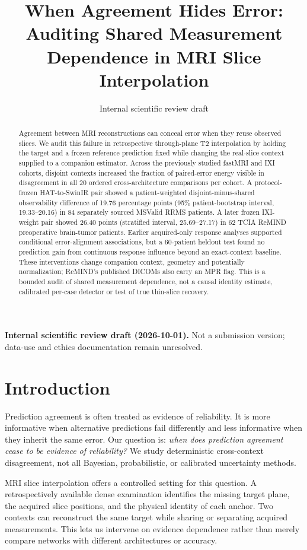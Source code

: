 \documentclass[10pt,twocolumn,letterpaper]{article}
\title{When Agreement Hides Error:\\
Auditing Shared Measurement Dependence in MRI Slice Interpolation}
\author{Internal scientific review draft}
\begin{document}
\maketitle
\noindent\textbf{Internal scientific review draft (2026-10-01).} Not a submission version; data-use and ethics documentation remain unresolved.\par\smallskip

\begin{abstract}
Agreement between MRI reconstructions can conceal error when they reuse observed slices. We audit this failure in retrospective through-plane T2 interpolation by holding the target and a frozen reference prediction fixed while changing the real-slice context supplied to a companion estimator. Across the previously studied fastMRI and IXI cohorts, disjoint contexts increased the fraction of paired-error energy visible in disagreement in all 20 ordered cross-architecture comparisons per cohort. A protocol-frozen HAT-to-SwinIR pair showed a patient-weighted disjoint-minus-shared observability difference of 19.76 percentage points (95\% patient-bootstrap interval, 19.33--20.16) in 84 separately sourced MSValid RRMS patients. A later frozen IXI-weight pair showed 26.40 points (stratified interval, 25.69--27.17) in 62 TCIA ReMIND preoperative brain-tumor patients. Earlier acquired-only response analyses supported conditional error-alignment associations, but a 60-patient heldout test found no prediction gain from continuous response influence beyond an exact-context baseline. These interventions change companion context, geometry and potentially normalization; ReMIND's published DICOMs also carry an MPR flag. This is a bounded audit of shared measurement dependence, not a causal identity estimate, calibrated per-case detector or test of true thin-slice recovery.
\end{abstract}

\section{Introduction}
Prediction agreement is often treated as evidence of reliability. It is more informative when alternative predictions fail differently and less informative when they inherit the same error. Our question is: \emph{when does prediction agreement cease to be evidence of reliability?} We study deterministic cross-context disagreement, not all Bayesian, probabilistic, or calibrated uncertainty methods.

MRI slice interpolation offers a controlled setting for this question. A retrospectively available dense examination identifies the missing target plane, the acquired slice positions, and the physical identity of each anchor. Two contexts can reconstruct the same target while sharing or separating acquired measurements. This lets us intervene on evidence dependence rather than merely compare networks with different architectures or accuracy.
\end{document}
